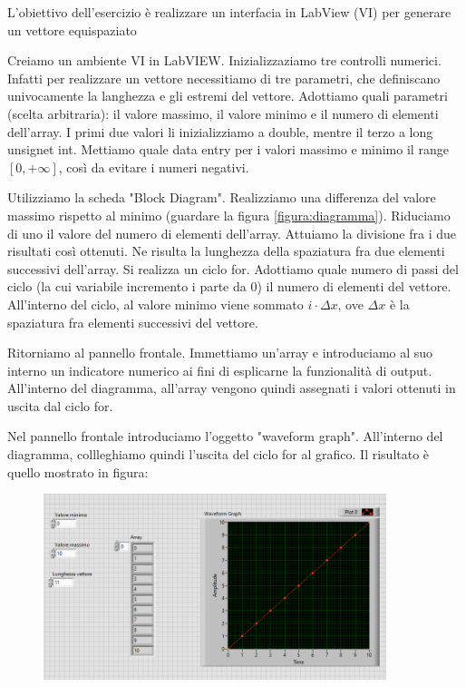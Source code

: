 L'obiettivo dell'esercizio è realizzare un interfacia in LabView (VI) per generare un vettore equispaziato

Creiamo un ambiente VI in LabVIEW. Inizializzaziamo tre controlli numerici. Infatti per realizzare un vettore necessitiamo di tre parametri, che definiscano univocamente la langhezza e gli estremi del vettore. Adottiamo quali parametri (scelta arbitraria): il valore massimo, il valore minimo e il numero di elementi dell'array. I primi due valori li inizializziamo a double, mentre il terzo a long unsignet int.
Mettiamo quale data entry per i valori massimo e minimo il range $[0, +\infty]$, così da evitare i numeri negativi.

Utilizziamo la scheda "Block Diagram". Realizziamo una differenza del valore massimo rispetto al minimo (guardare la figura \ref{figura:diagramma}). Riduciamo di uno il valore del numero di elementi dell'array. Attuiamo la divisione fra i due risultati così ottenuti. Ne risulta la lunghezza della spaziatura fra due elementi successivi dell'array.
Si realizza un ciclo for. Adottiamo quale numero di passi del ciclo (la cui variabile incremento i parte da 0) il numero di elementi del vettore. All'interno del ciclo, al valore minimo viene sommato $i \cdot \Delta x$, ove $\Delta x$ è la spaziatura fra elementi successivi del vettore.

Ritorniamo al pannello frontale. Immettiamo un'array e introduciamo al suo interno un indicatore numerico ai fini di esplicarne la funzionalità di output. All'interno del diagramma, all'array vengono quindi assegnati i valori ottenuti in uscita dal ciclo for. 

Nel pannello frontale introduciamo l'oggetto "waveform graph". All'interno del diagramma, collleghiamo quindi l'uscita del ciclo for al grafico. Il risultato è quello mostrato in figura:
\begin{figure}[H]
\caption{}
    \includegraphics[width=10cm]{settimana_1/immagini/PannelloVettore.png}\label{figura:pannello}
    \centering
\end{figure}

